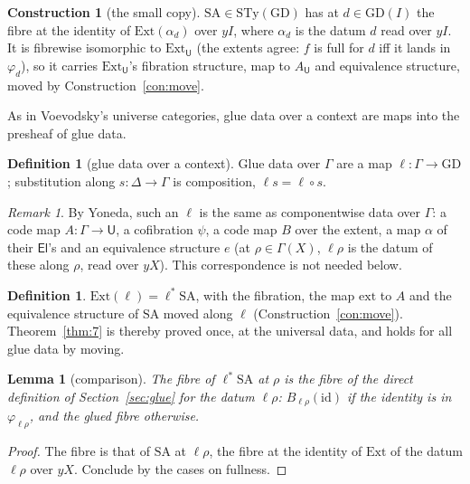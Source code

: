 \documentclass[11pt]{article}
\newcommand{\U}{\mathsf{U}}
\newcommand{\El}{\mathsf{El}}
\newcommand{\Ext}{\mathrm{Ext}}
\newcommand{\ext}{\mathrm{ext}}
\newcommand{\STy}{\mathrm{STy}}
\newcommand{\GD}{\mathrm{GD}}
\newcommand{\SA}{\mathrm{SA}}
\theoremstyle{plain}
\newtheorem{lemma}[theorem]{Lemma}
\theoremstyle{definition}
\newtheorem{definition}[theorem]{Definition}
\newtheorem{construction}[theorem]{Construction}
\theoremstyle{remark}
\newtheorem{remark}[theorem]{Remark}
\begin{document}
\begin{construction}[the small copy]
$\SA\in\STy(\GD)$ has at $d\in\GD(I)$ the fibre at the identity of
$\Ext(\alpha_d)$ over $yI$, where $\alpha_d$ is the datum $d$ read over
$yI$. It is fibrewise isomorphic to $\Ext_\U$ (the extents agree: $f$ is
full for $d$ iff it lands in $\varphi_d$), so it carries $\Ext_\U$'s
fibration structure, map to $A_\U$ and equivalence structure, moved by
Construction~\ref{con:move}.
\end{construction}

As in Voevodsky's universe categories, glue data over a context are
maps into the presheaf of glue data.

\begin{definition}[glue data over a context]
Glue data over $\Gamma$ are a map $\ell:\Gamma\to\GD$; substitution along
$s:\Delta\to\Gamma$ is composition, $\ell s=\ell\circ s$.
\end{definition}

\begin{remark}
By Yoneda, such an $\ell$ is the same as componentwise data over $\Gamma$:
a code map $A:\Gamma\to\U$, a cofibration $\psi$, a code map $B$ over the
extent, a map $\alpha$ of their $\El$'s and an equivalence structure $e$
(at $\rho\in\Gamma(X)$, $\ell\rho$ is the datum of these along $\rho$,
read over $yX$). This correspondence is not needed below.
\end{remark}

\begin{definition}\label{def:ext-ell}
$\Ext(\ell)=\ell^*\SA$, with the fibration, the map $\ext$ to $A$ and the
equivalence structure of $\SA$ moved along $\ell$
(Construction~\ref{con:move}). Theorem~\ref{thm:7} is thereby proved once,
at the universal data, and holds for all glue data by moving.
\end{definition}

\begin{lemma}[comparison]\label{lem:ext-cmp}
The fibre of $\ell^*\SA$ at $\rho$ is the fibre of the direct definition
of Section~\ref{sec:glue} for the datum $\ell\rho$: $B_{\ell\rho}(\mathrm{id})$
if the identity is in $\varphi_{\ell\rho}$, and the glued fibre otherwise.
\end{lemma}

\begin{proof}
The fibre is that of $\SA$ at $\ell\rho$, the fibre at the identity of
$\Ext$ of the datum $\ell\rho$ over $yX$. Conclude by the cases on
fullness.
\end{proof}
\end{document}
